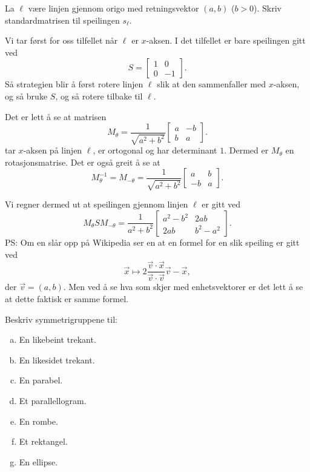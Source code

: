 \documentclass[11pt, norsk]{article}
\begin{document}
\begin{oppg}
La $\ell$ være linjen gjennom origo med retningsvektor $(a,b)$ ($b > 0$). Skriv standardmatrisen til speilingen $s_{\ell}$. 
\end{oppg}
\begin{losn}
Vi tar først for oss tilfellet når $\ell$ er $x$-aksen. I det tilfellet er bare speilingen gitt ved 
$$ 
S = \begin{bmatrix}
1 & 0 \\ 0 & -1
\end{bmatrix}.
$$
Så strategien blir å først rotere linjen $\ell$ slik at den sammenfaller med $x$-aksen, og så bruke $S$, og så rotere tilbake til $\ell$.

Det er lett å se at matrisen 
$$ 
M_\theta = \frac{1}{\sqrt{a^2+b^2}} \begin{bmatrix}
a & -b \\ b & a
\end{bmatrix}.
$$
tar $x$-aksen på linjen $\ell$, er ortogonal og har determinant $1$. Dermed er $M_\theta$ en rotasjonsmatrise. Det er også greit å se at
$$ 
M_\theta^{-1} = M_{-\theta} = \frac{1}{\sqrt{a^2+b^2}} \begin{bmatrix}
a & b \\ -b & a
\end{bmatrix}.
$$

Vi regner dermed ut at speilingen gjennom linjen $\ell$ er gitt ved
$$
M_\theta S M_{-\theta} = \frac{1}{a^2+b^2} \begin{bmatrix}
a^2-b^2 & 2ab \\ 
2ab & b^2-a^2
\end{bmatrix}.
$$
PS: Om en slår opp på Wikipedia ser en at en formel for en slik speiling er gitt ved 
$$
\vec x \mapsto 2 \frac{\vec v \cdot \vec x}{\vec v \cdot \vec v} \vec v - \vec x,
$$
der $\vec v = (a,b)$. Men ved å se hva som skjer med enhetsvektorer er det lett å se at dette faktisk er samme formel.
\end{losn}

\begin{oppg}
Beskriv symmetrigruppene til:
\begin{enumerate}[a)]
\item En likebeint trekant.
\item En likesidet trekant.
\item En parabel.
\item Et parallellogram.
\item En rombe.
\item Et rektangel.
\item En ellipse.
\end{enumerate}
\end{oppg}
\end{document}
